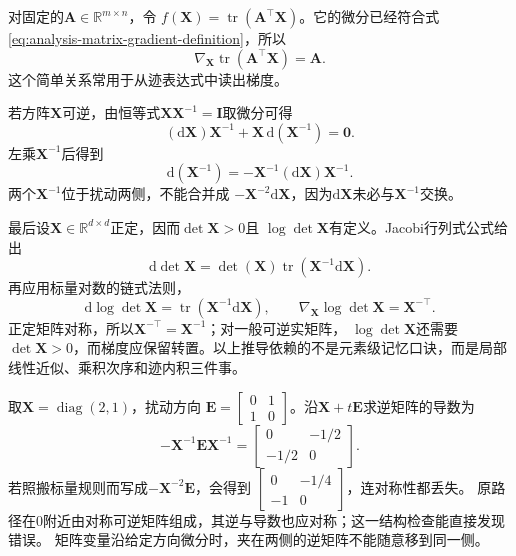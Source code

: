对固定的$\bm{A}\in\mathbb{R}^{m\times n}$，令 $f(\bm{X})=\operatorname{tr}(\bm{A}^{\top}\bm{X})$。它的微分已经符合式
\eqref{eq:analysis-matrix-gradient-definition}，所以
\begin{equation}
  \nabla_{\bm{X}}\operatorname{tr}(\bm{A}^{\top}\bm{X})
  =\bm{A}.
\label{eq:analysis-trace-linear-gradient}
\end{equation}
这个简单关系常用于从迹表达式中读出梯度。

若方阵$\bm{X}$可逆，由恒等式$\bm{X}\bm{X}^{-1}=\bm{I}$取微分可得
\[   (\mathrm{d}\bm{X})\bm{X}^{-1}   +\bm{X}\,\mathrm{d}(\bm{X}^{-1})=\bm{0}. \]
左乘$\bm{X}^{-1}$后得到
\begin{equation}
  \mathrm{d}(\bm{X}^{-1})
  =
  -\bm{X}^{-1}(\mathrm{d}\bm{X})\bm{X}^{-1}.
\label{eq:analysis-inverse-differential}
\end{equation}
两个$\bm{X}^{-1}$位于扰动两侧，不能合并成 $-\bm{X}^{-2}\mathrm{d}\bm{X}$，因为$\mathrm{d}\bm{X}$未必与$\bm{X}^{-1}$交换。

最后设$\bm{X}\in\mathbb{R}^{d\times d}$正定，因而$\det\bm{X}>0$且 $\log\det\bm{X}$有定义。Jacobi行列式公式给出
\[   \mathrm{d}\det\bm{X}   =   \det(\bm{X})\operatorname{tr}   (\bm{X}^{-1}\mathrm{d}\bm{X}). \]
再应用标量对数的链式法则，
\begin{equation}
  \mathrm{d}\log\det\bm{X}
  =
  \operatorname{tr}(\bm{X}^{-1}\mathrm{d}\bm{X}),
  \qquad
  \nabla_{\bm{X}}\log\det\bm{X}
  =
  \bm{X}^{-\top}.
\label{eq:analysis-logdet-gradient}
\end{equation}
正定矩阵对称，所以$\bm{X}^{-\top}=\bm{X}^{-1}$；对一般可逆实矩阵， $\log\det\bm{X}$还需要$\det\bm{X}>0$，而梯度应保留转置。以上推导依赖的不是元素级记忆口诀，而是局部线性近似、乘积次序和迹内积三件事。
\begin{example}[逆矩阵微分中的乘法次序]
\label{ex:analysis-noncommuting-inverse-differential}
取$\bm X=\operatorname{diag}(2,1)$，扰动方向
$\bm E=\begin{bmatrix}0&1\\1&0\end{bmatrix}$。沿$\bm X+t\bm E$求逆矩阵的导数为
\[
 -\bm X^{-1}\bm E\bm X^{-1}
 =\begin{bmatrix}0&-1/2\\-1/2&0\end{bmatrix}.
\]
若照搬标量规则而写成$-\bm X^{-2}\bm E$，会得到
$\begin{bmatrix}0&-1/4\\-1&0\end{bmatrix}$，连对称性都丢失。
原路径在$0$附近由对称可逆矩阵组成，其逆与导数也应对称；这一结构检查能直接发现错误。
矩阵变量沿给定方向微分时，夹在两侧的逆矩阵不能随意移到同一侧。
\end{example}

